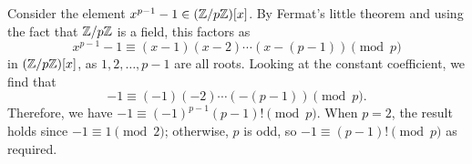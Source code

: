 \begin{thm}[Wilson]\label{thm:5.4}
    Consider the element $x^{p-1} - 1 \in (\mathbb{Z}/p\mathbb{Z})[x]$. By Fermat's little theorem 
    and using the fact that $\mathbb{Z}/p\mathbb{Z}$ is a field, this factors as 
    \[ x^{p-1} - 1 \equiv (x-1)(x-2) \cdots (x-(p-1)) \pmod p \] 
    in $(\mathbb{Z}/p\mathbb{Z})[x]$, as $1, 2, \dots, p-1$ are all roots. Looking at the constant 
    coefficient, we find that 
    \[ -1 \equiv (-1)(-2) \cdots (-(p-1)) \pmod p. \] 
    Therefore, we have $-1 \equiv (-1)^{p-1} (p-1)! \pmod p$. When $p = 2$, 
    the result holds since $-1 \equiv 1 \pmod 2$; otherwise, $p$ is odd, 
    so $-1 \equiv (p-1)! \pmod p$ as required. 
\end{thm}